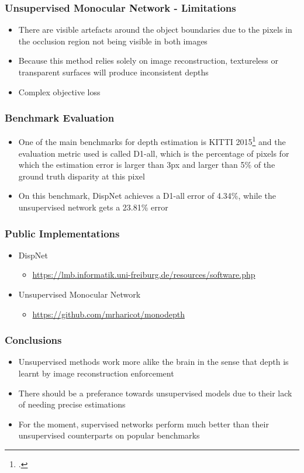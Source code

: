 \documentclass{beamer}
\begin{document}
\begin{frame}
\frametitle{Unsupervised Monocular Network - Limitations}
\center
\begin{itemize}
	\item There are visible artefacts around the object boundaries due to the pixels in the occlusion region not being visible in both images
	\item Because this method relies solely on image reconstruction, textureless or transparent surfaces will produce inconsistent depths
	\item Complex objective loss
\end{itemize}
\end{frame}

\begin{frame}
\frametitle{Benchmark Evaluation}
\center
\begin{itemize}
	\item One of the main benchmarks for depth estimation is KITTI 2015\footcite{Menze2015CVPR} and the evaluation metric used is called D1-all, which is the percentage of pixels for which the estimation error is larger than 3px and larger than 5\% of the ground truth disparity at this pixel
	\item On this benchmark, DispNet achieves a D1-all error of 4.34\%, while the unsupervised network gets a 23.81\% error
\end{itemize}
\end{frame}

\begin{frame}
\frametitle{Public Implementations}
\center
\begin{itemize}
	\item DispNet 
		\begin{itemize}
			\item \url{https://lmb.informatik.uni-freiburg.de/resources/software.php}
		\end{itemize}
		
	\item Unsupervised Monocular Network 
		\begin{itemize}
			\item \url{https://github.com/mrharicot/monodepth}
		\end{itemize}
	
\end{itemize}
\end{frame}

\begin{frame}
\frametitle{Conclusions}
\center
\begin{itemize}
	\item Unsupervised methods work more alike the brain in the sense that depth is learnt by image reconstruction enforcement
	\item There should be a preferance towards unsupervised models due to their lack of needing precise estimations
	\item For the moment, supervised networks perform much better than their unsupervised counterparts on popular benchmarks
\end{itemize}
\end{frame}
\end{document}
